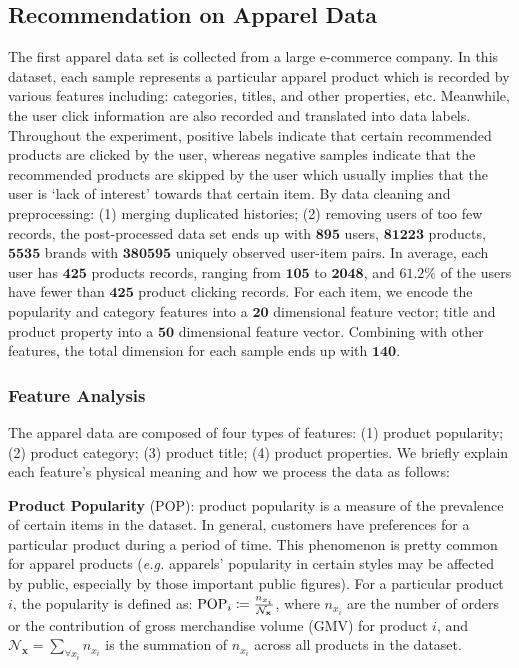 {\subsection{Recommendation on Apparel Data}
The first apparel data set is collected from a large e-commerce company.  In this dataset, each sample represents a particular apparel product which is recorded by various features including: categories, titles, and other properties, etc.  Meanwhile, the user click information are also recorded and translated into data labels. Throughout the experiment, positive labels indicate that certain recommended products are clicked by the user, whereas negative samples indicate that the recommended products are skipped by the user which usually implies that the user is `lack of interest' towards that certain item.  By data cleaning and preprocessing: (1) merging duplicated histories; (2) removing users of too few records, the post-processed data set ends up with $\mathbf{895}$ users, $\mathbf{81223}$ products, $\mathbf{5535}$ brands with $\mathbf{380595}$ uniquely observed user-item pairs.  In average, each user has $\mathbf{425}$ products records, ranging from $\mathbf{105}$ to $\mathbf{2048}$, and $\mathbf{61.2\%}$ of the users have fewer than $\mathbf{425}$ product clicking records.  For each item, we encode the popularity and category features into a $\mathbf{20}$ dimensional feature vector; title and product property into a $\mathbf{50}$ dimensional feature vector.  Combining with other features, the total dimension for each sample ends up with $\mathbf{140}$.

\subsubsection{Feature Analysis}
The apparel data are composed of four types of features: (1) product popularity; (2) product category; (3) product title; (4) product properties.  We briefly explain each feature's physical meaning and how we process the data as follows:

\textbf{Product Popularity} (POP): product popularity is a measure of the prevalence of certain items in the dataset. In general, customers have preferences for a particular product during a period of time. This phenomenon is pretty common for apparel products (\emph{e.g.} apparels' popularity in certain styles may be affected by public, especially by those important public figures). For a particular product $i$, the popularity is defined as: $\mathrm{\scriptsize POP}_{i} \coloneqq \frac{n_{x_i}}{\mathcal{N}_\mathbf{x}}$, where $n_{x_i}$ are the number of orders or the contribution of gross merchandise volume (GMV) for product $i$,  and $\mathcal{N}_\mathbf{x} = \sum_{\forall x_i}n_{x_i}$ is the summation of $n_{x_i}$ across all products in the dataset. \newline

}
